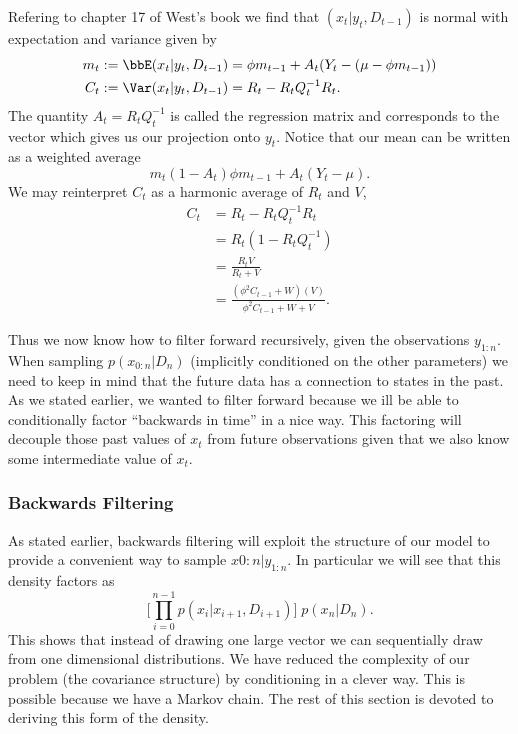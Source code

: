 \documentclass{article}
\begin{document}
Refering to chapter 17 of West's book we find that $(x_t|y_t, D_{t-1})$ is normal with expectation and variance given by
\begin{align*}
m_t & := \bbE(x_t | y_t, D_{t-1}) = \phi m_{t-1} + A_t (Y_t - (\mu - \phi m_{t-1}) ) \\
C_t & := \Var(x_t | y_t, D_{t-1}) = R_t - R_t Q_t^{-1} R_t.
\end{align*}
The quantity $A_t = R_t Q_t^{-1}$ is called the regression matrix and corresponds to the vector which gives us our projection onto $y_t$.  Notice that our mean can be written as a weighted average
\[
m_t (1-A_t) \phi m_{t-1} + A_t (Y_t - \mu).
\]
We may reinterpret $C_t$ as a harmonic average of $R_t$ and $V$,
\begin{align*}
C_t & = R_t - R_t Q_t^{-1} R_t \\
& = R_t (1 - R_t Q_t^{-1}) \\
& = \frac{R_t V}{R_t + V} \\
& = \frac{(\phi^2 C_{t-1} + W)(V)}{\phi^2 C_{t-1} + W + V}.
\end{align*}


Thus we now know how to filter forward recursively, given the observations $y_{1:n}$.  When sampling $p(x_{0:n} | D_n)$ (implicitly conditioned on the other parameters) we need to keep in mind that the future data has a connection to states in the past.  As we stated earlier, we wanted to filter forward because we ill be able to conditionally factor ``backwards in time'' in a nice way.  This factoring will decouple those past values of $x_t$ from future observations given that we also know some intermediate value of $x_t$. 

\subsubsection{Backwards Filtering}

As stated earlier, backwards filtering will exploit the structure of our model to provide a convenient way to sample $x{0:n} | y_{1:n}$.  In particular we will see that this density factors as
\[
\Big[ \prod_{i=0}^{n-1} p(x_i | x_{i+1}, D_{i+1}) \Big] \; p(x_n | D_n).
\]
This shows that instead of drawing one large vector we can sequentially draw from one dimensional distributions.  We have reduced the complexity of our problem (the covariance structure) by conditioning in a clever way.  This is possible because we have a Markov chain.  The rest of this section is devoted to deriving this form of the density.
\end{document}
